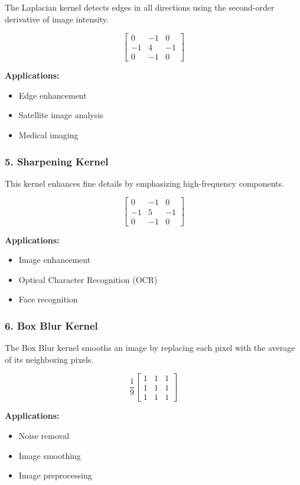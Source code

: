 \documentclass[11pt]{article}
\begin{document}
The Laplacian kernel detects edges in all directions using the second-order derivative of image intensity.

\[
\begin{bmatrix}
0 & -1 & 0\\
-1 & 4 & -1\\
0 & -1 & 0
\end{bmatrix}
\]

\textbf{Applications:}
\begin{itemize}
\item Edge enhancement
\item Satellite image analysis
\item Medical imaging
\end{itemize}

\subsubsection*{5. Sharpening Kernel}

This kernel enhances fine details by emphasizing high-frequency components.

\[
\begin{bmatrix}
0 & -1 & 0\\
-1 & 5 & -1\\
0 & -1 & 0
\end{bmatrix}
\]

\textbf{Applications:}
\begin{itemize}
\item Image enhancement
\item Optical Character Recognition (OCR)
\item Face recognition
\end{itemize}

\subsubsection*{6. Box Blur Kernel}

The Box Blur kernel smooths an image by replacing each pixel with the average of its neighboring pixels.

\[
\frac{1}{9}
\begin{bmatrix}
1 & 1 & 1\\
1 & 1 & 1\\
1 & 1 & 1
\end{bmatrix}
\]

\textbf{Applications:}
\begin{itemize}
\item Noise removal
\item Image smoothing
\item Image preprocessing
\end{itemize}
\end{document}
